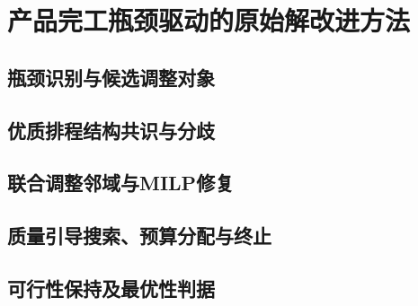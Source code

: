 \section{产品完工瓶颈驱动的原始解改进方法}\label{sec:third-innovation}
\subsection{瓶颈识别与候选调整对象}
\vspace*{5cm}
\subsection{优质排程结构共识与分歧}
\vfill\null\clearpage
\subsection{联合调整邻域与MILP修复}
\par\vspace*{4cm}
\subsection{质量引导搜索、预算分配与终止}
\vspace*{3cm}
\subsection{可行性保持及最优性判据}
\vfill\null
